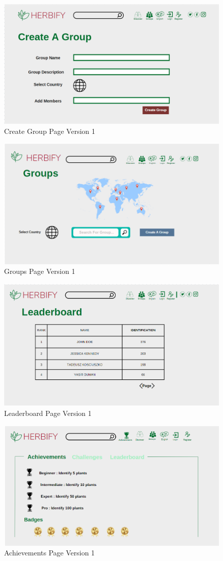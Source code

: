 \documentclass[conference]{IEEEtran}
\begin{document}
\begin{figure}[H]
\centerline{\includegraphics[width=0.48 \textwidth]{images/creategroupv1.png}}
\caption{Create Group Page Version 1}
\label{fig:graph1}
\end{figure}


\begin{figure}[H]
\centerline{\includegraphics[width=0.48 \textwidth]{images/groupsv1.png}}
\caption{Groups Page Version 1}
\label{fig:graph1}
\end{figure}



\begin{figure}[H]
\centerline{\includegraphics[width=0.48 \textwidth]{images/leaderboardv2.png}}
\caption{Leaderboard Page Version 1}
\label{fig:graph1}
\end{figure}


\begin{figure}[H]
\centerline{\includegraphics[width=0.48 \textwidth]{images/achivementsv1.png}}
\caption{Achievements Page Version 1}
\label{fig:graph1}
\end{figure}
\end{document}
